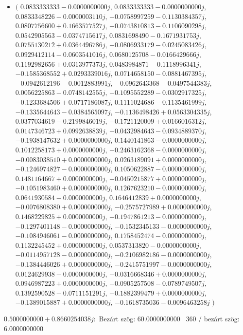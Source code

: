 \documentclass[14pt,a4paper]{article}
\begin{document}
\begin{itemize}
\item
$\big($
$0.0833333333-0.0000000000j$, $0.0833333333-0.0000000000j$, $0.0833348226-0.0000003110j$, $-0.0758997259-0.1130384357j$, $0.0807756600+0.1663577527j$, $-0.0743810813-0.1106090298j$, $0.0542905563-0.0374715617j$, $0.0831698490-0.1671931753j$, $0.0755130212+0.0364496786j$, $-0.0806933179-0.0245083426j$, $0.0929412114-0.0603541016j$, $0.0680125708-0.0166429666j$, $0.1192982656+0.0313977373j$, $0.0483984871-0.1118996341j$, $-0.1585368552+0.0293339016j$, $0.0714658150-0.0881467395j$, $-0.0942612196-0.0012883991j$, $-0.0962643368-0.0497544383j$, $0.0056225863-0.0748142555j$, $-0.1095552289-0.0302917325j$, $-0.1233684506+0.0717186087j$, $0.1111024686-0.1135461999j$, $-0.1335644643-0.0384565097j$, $-0.1136498426+0.0563304335j$, $0.0377034619-0.2199846019j$, $-0.1721120009+0.0166016312j$, $0.0147346723+0.0992638839j$, $-0.0432984643-0.0934889370j$, $-0.1938147632+0.0000000000j$, $0.1440141863-0.0000000000j$, $0.1012258173+0.0000000000j$, $-0.2463162368-0.0000000000j$, $-0.0083038510+0.0000000000j$, $0.0263189091+0.0000000000j$, $-0.1246974827-0.0000000000j$, $0.1050622887-0.0000000000j$, $0.1481164667+0.0000000000j$, $-0.0450215877+0.0000000000j$, $-0.1051983460+0.0000000000j$, $0.1267623210-0.0000000000j$, $0.0641930584-0.0000000000j$, $0.1646412839+0.0000000000j$, $-0.0076808380+0.0000000000j$, $-0.2575727989+0.0000000000j$, $0.1468229825+0.0000000000j$, $-0.1947861213-0.0000000000j$, $-0.1297401148-0.0000000000j$, $-0.1532345133-0.0000000000j$, $-0.1084946061-0.0000000000j$, $0.1758452474-0.0000000000j$, $0.1132245452+0.0000000000j$, $0.0537313820-0.0000000000j$, $-0.0114957128-0.0000000000j$, $-0.2106982186-0.0000000000j$, $-0.1384446026+0.0000000000j$, $-0.2415751997-0.0000000000j$, $0.0124629938-0.0000000000j$, $-0.0316668346+0.0000000000j$, $0.0946987223+0.0000000000j$, $-0.0905257508-0.0789749507j$, $0.1392590528-0.0711151291j$, $-0.1882399479+0.0000000000j$, $-0.1389015887+0.0000000000j$, $-0.1618735036-0.0096463258j$
$\big)$
\end{itemize}
$0.5000000000+0.8660254038j$:\
Bezárt szög: $60.0000000000$ \
360 / bezárt szög: $6.0000000000$\
\end{document}
